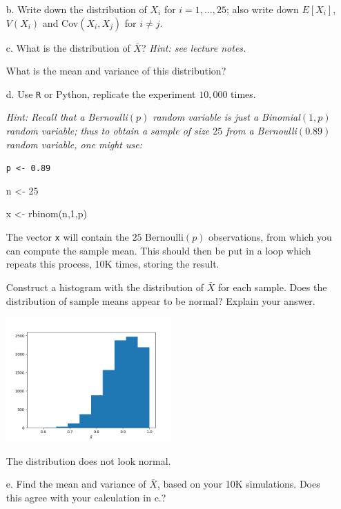 \documentclass{article}
\newcommand{\1}{\mathbf{1}}
\begin{document}
\begin{itemize} 
    \item[b.] Write down the distribution of $X_i$ for $i=1,\ldots ,25$; also write down $E[X_i]$, $V(X_i)$ and Cov$(X_i,X_j)$ for $i\neq j$.
    
    \item[c.] What is the distribution of $\bar{X}$? {\it Hint: see lecture notes.}\par
    What is the mean and variance of this distribution?
        
    \newpage
    \item[d.] Use {\tt R} or Python, replicate the experiment $10,000$ times. \par
    {\it Hint: Recall that a Bernoulli$(p)$ random variable is just a Binomial$(1,p)$ random variable; thus to obtain a sample of size $25$ from a Bernoulli$(0.89)$ random variable, one might use:\par
    {\tt p <- 0.89\par
        n <- 25\par
        x <- rbinom(n,1,p)
    }\par
    The vector {\tt x} will contain the $25$ Bernoulli$(p)$ observations, from which you can compute the sample mean. This should then be put in a loop which repeats this process, 10K times, storing the result.} Construct a histogram with the distribution of $\bar{X}$ for each sample. Does the distribution of sample means appear to be normal? Explain your answer. 
    
    \begin{center}
        \includegraphics[width=0.5\textwidth]{STATS509/HW7/HW7Figures/Problem1.png}
    \end{center}
    
    The distribution does not look normal. 
    
    
    
    
    \item[e.] Find the mean and variance of $\bar{X}$, based on your 10K simulations.  Does this agree with your calculation in c.?


\end{itemize}
\end{document}
